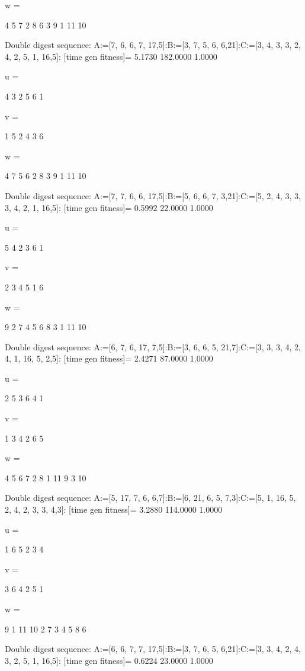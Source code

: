 w =

     4     5     7     2     8     6     3     9     1    11    10

Double digest sequence:
A:=[7, 6, 6, 7, 17,5]:B:=[3, 7, 5, 6, 6,21]:C:=[3, 4, 3, 3, 2, 4, 2, 5, 1, 16,5]:
[time gen fitness]=
    5.1730  182.0000    1.0000


u =

     4     3     2     5     6     1


v =

     1     5     2     4     3     6


w =

     4     7     5     6     2     8     3     9     1    11    10

Double digest sequence:
A:=[7, 7, 6, 6, 17,5]:B:=[5, 6, 6, 7, 3,21]:C:=[5, 2, 4, 3, 3, 3, 4, 2, 1, 16,5]:
[time gen fitness]=
    0.5992   22.0000    1.0000


u =

     5     4     2     3     6     1


v =

     2     3     4     5     1     6


w =

     9     2     7     4     5     6     8     3     1    11    10

Double digest sequence:
A:=[6, 7, 6, 17, 7,5]:B:=[3, 6, 6, 5, 21,7]:C:=[3, 3, 3, 4, 2, 4, 1, 16, 5, 2,5]:
[time gen fitness]=
    2.4271   87.0000    1.0000


u =

     2     5     3     6     4     1


v =

     1     3     4     2     6     5


w =

     4     5     6     7     2     8     1    11     9     3    10

Double digest sequence:
A:=[5, 17, 7, 6, 6,7]:B:=[6, 21, 6, 5, 7,3]:C:=[5, 1, 16, 5, 2, 4, 2, 3, 3, 4,3]:
[time gen fitness]=
    3.2880  114.0000    1.0000


u =

     1     6     5     2     3     4


v =

     3     6     4     2     5     1


w =

     9     1    11    10     2     7     3     4     5     8     6

Double digest sequence:
A:=[6, 6, 7, 7, 17,5]:B:=[3, 7, 6, 5, 6,21]:C:=[3, 3, 4, 2, 4, 3, 2, 5, 1, 16,5]:
[time gen fitness]=
    0.6224   23.0000    1.0000



